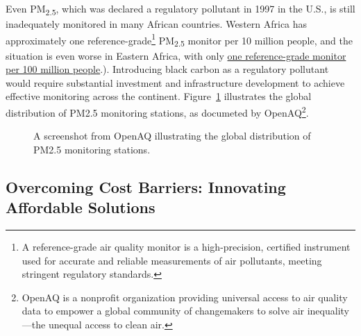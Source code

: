 \documentclass[
  letterpaper,
  DIV=11,
  numbers=noendperiod]{scrartcl}
\begin{document}
Even PM\textsubscript{2.5}, which was declared a regulatory pollutant in
1997 in the U.S., is still inadequately monitored in many African
countries. Western Africa has approximately one
reference-grade\footnote{A reference-grade air quality monitor is a
  high-precision, certified instrument used for accurate and reliable
  measurements of air pollutants, meeting stringent regulatory
  standards.} PM\textsubscript{2.5} monitor per 10 million people, and
the situation is even worse in Eastern Africa, with only
\href{https://scielo.org.za/scielo.php?script=sci_arttext&pid=S2410-972X2021000100009\#:~:text=In\%20Western\%20Africa\%2C\%20there\%20is,et\%20al.\%2C\%202020}{one
reference-grade monitor per 100 million people}.). Introducing black
carbon as a regulatory pollutant would require substantial investment
and infrastructure development to achieve effective monitoring across
the continent. Figure~\ref{fig-openaq} illustrates the global
distribution of PM2.5 monitoring stations, as documeted by
OpenAQ\footnote{OpenAQ is a nonprofit organization providing universal
  access to air quality data to empower a global community of
  changemakers to solve air inequality---the unequal access to clean
  air.}.

\begin{figure}


\caption{\label{fig-openaq}A screenshot from OpenAQ illustrating the
global distribution of PM2.5 monitoring stations.}

\end{figure}%

\subsection{Overcoming Cost Barriers: Innovating Affordable
Solutions}\label{overcoming-cost-barriers-innovating-affordable-solutions}
\end{document}
